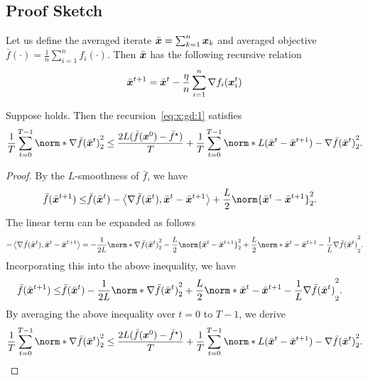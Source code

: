 \documentclass{article}
\begin{document}
\subsection{Proof Sketch}
Let us define the averaged iterate $\bar{\bm{x}}=\sum_{k=1}^n \bm{x}_k$ and averaged objective $\bar{f}(\cdot)=\frac{1}{n}\sum_{i=1}^n f_i(\cdot)$. Then $\bar{\bm{x}}$ has the following recursive relation
\begin{equation}\label{eq:barx:gd:1}
  \bar{\bm{x}}^{t+1} = \bar{\bm{x}}^t - \frac{\eta}{n} \sum_{i=1}^n \nabla f_i(\bm{x}^t_i)
\end{equation}

\begin{lemma}\label{lemma:sd:1}
  Suppose  holds. Then the recursion~\eqref{eq:x:gd:1} satisfies
  \begin{align*}
    \frac{1}{T} \sum_{t=0}^{T-1} \norm*{\nabla \bar{f}(\bar{\xx}^{t})}_2^2
    \le \frac{2L(\bar{f}(\xx^{0}) - \bar{f}^\star)}{T}
    + \frac{1}{T} \sum_{t=0}^{T-1} \norm*{L(\bar{\xx}^{t}-\bar{\xx}^{t+1}) - \nabla \bar{f}(\bar{\xx}^{t})}_2^2.
  \end{align*}
\end{lemma}
\begin{proof}
  By the $L$-smoothness  of $\bar{f}$, we have
  \begin{align*}
    \bar{f}(\bar{\xx}^{t+1}) \le& \bar{f}(\bar{\xx}^{t}) - \left\langle\nabla \bar{f}(\bar{\xx}^{t}), \bar{\xx}^{t} - \bar{\xx}^{t+1} \right\rangle + \frac{L}{2} \norm{\bar{\xx}^{t}-\bar{\xx}^{t+1}}_2^2.
  \end{align*}
  The linear term can be expanded as follows
  \begin{align*}
    - \left\langle\nabla \bar{f}(\bar{\xx}^{t}), \bar{\xx}^{t} - \bar{\xx}^{t+1} \right\rangle 
    =- \frac{1}{2L} \norm*{\nabla \bar{f}(\bar{\xx}^{t})}_2^2 - \frac{L}{2} \norm{\bar{\xx}^{t}-\bar{\xx}^{t+1}}_2^2
    + \frac{L}{2} \norm*{\bar{\xx}^{t}-\bar{\xx}^{t+1} - \frac{1}{L}\nabla \bar{f}(\bar{\xx}^{t})}_2^2.
  \end{align*}
  Incorporating this into the above inequality, we have 
  \begin{align*}
    \bar{f}(\bar{\xx}^{t+1}) \le& \bar{f}(\bar{\xx}^{t}) - \frac{1}{2L} \norm*{\nabla \bar{f}(\bar{\xx}^{t})}_2^2
    + \frac{L}{2} \norm*{\bar{\xx}^{t}-\bar{\xx}^{t+1} - \frac{1}{L}\nabla \bar{f}(\bar{\xx}^{t})}_2^2.
  \end{align*}
  By averaging the above inequality over $t=0$ to $T-1$, we derive
  \begin{align*}
    \frac{1}{T} \sum_{t=0}^{T-1} \norm*{\nabla \bar{f}(\bar{\xx}^{t})}_2^2
    \le \frac{2L(\bar{f}(\xx^{0}) - \bar{f}^\star)}{T}
    + \frac{1}{T} \sum_{t=0}^{T-1} \norm*{L(\bar{\xx}^{t}-\bar{\xx}^{t+1}) - \nabla \bar{f}(\bar{\xx}^{t})}_2^2.
  \end{align*}
\end{proof}
\end{document}
